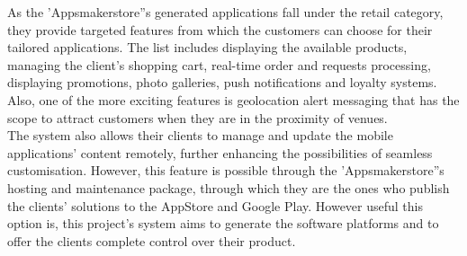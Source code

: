 As the 'Appsmakerstore''s generated applications fall under the retail category, they provide targeted features from which the customers can choose for their tailored applications. The list includes displaying the available products, managing the client's shopping cart, real-time order and requests processing, displaying promotions, photo galleries, push notifications and loyalty systems. Also, one of the more exciting features is geolocation alert messaging that has the scope to attract customers when they are in the proximity of venues.\\

The system also allows their clients to manage and update the mobile applications' content remotely, further enhancing the possibilities of seamless customisation. However, this feature is possible through the 'Appsmakerstore''s hosting and maintenance package, through which they are the ones who publish the clients' solutions to the AppStore and Google Play. However useful this option is, this project's system aims to generate the software platforms and to offer the clients complete control over their product.